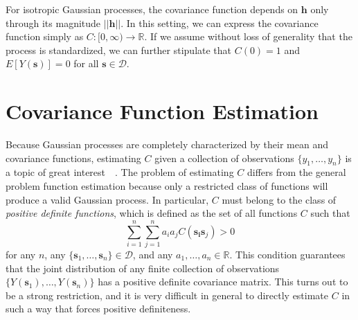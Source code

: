 For isotropic Gaussian processes, the covariance function depends on $\bm{h}$ only through its magnitude $||\bm{h}||$. In this setting, we can express the covariance function simply as $C: [0, \infty) \to \mathbb{R}$. If we assume without loss of generality that the process is standardized, we can further stipulate that $C(0) = 1$ and $E[Y(\bm{s})] = 0$ for all $\bm{s} \in \mathcal{D}$.



\section{Covariance Function Estimation} %
\label{sec:covariance_function_estimation}

Because Gaussian processes are completely characterized by their mean and covariance functions, estimating $C$ given a collection of observations $\{y_1, \dots, y_n\}$ is a topic of great interest~\cite{ver1993multivariable}~\cite{banerjee2014hierarchical}. The problem of estimating $C$ differs from the general problem function estimation because only a restricted class of functions will produce a valid Gaussian process. In particular, $C$ must belong to the class of \emph{positive definite functions}, which is defined as the set of all functions $C$ such that
\[
  \sum_{i=1}^n \sum_{j=1}^n a_i a_j C(\bm{s_i}\bm{s}_j) > 0
\]
for any $n$, any $\{\bm{s}_1, \dots, \bm{s}_n\} \in \mathcal{D}$, and any $a_1, \ldots, a_n \in \mathbb{R}$. This condition guarantees that the joint distribution of any finite collection of observations $\{Y(\bm{s}_1), \ldots, Y(\bm{s}_n)\}$ has a positive definite covariance matrix. This turns out to be a strong restriction, and it is very difficult in general to directly estimate $C$ in such a way that forces positive definiteness.

